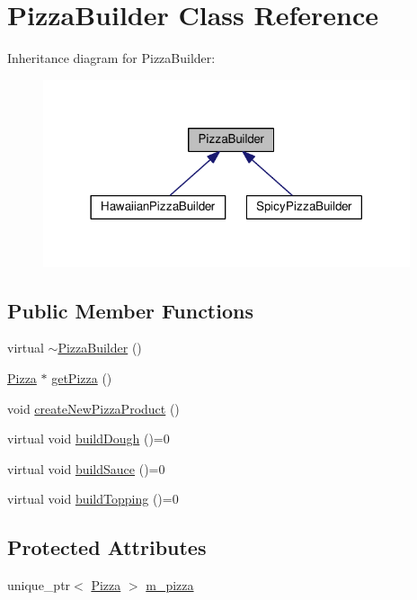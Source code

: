 \hypertarget{classPizzaBuilder}{}\section{Pizza\+Builder Class Reference}
\label{classPizzaBuilder}


Inheritance diagram for Pizza\+Builder\+:\nopagebreak
\begin{figure}[H]
\begin{center}
\leavevmode
\includegraphics[width=306pt]{classPizzaBuilder__inherit__graph}
\end{center}
\end{figure}
\subsection*{Public Member Functions}
\begin{DoxyCompactItemize}
\item 
virtual \hyperlink{classPizzaBuilder_a424dc27395e06a4c38beca703c91c258}{$\sim$\+Pizza\+Builder} ()
\item 
\hyperlink{classPizza}{Pizza} $\ast$ \hyperlink{classPizzaBuilder_a95ce87757351da71ab03f400802a0d1a}{get\+Pizza} ()
\item 
void \hyperlink{classPizzaBuilder_ad321d7aede0131b349c6853768ea1735}{create\+New\+Pizza\+Product} ()
\item 
virtual void \hyperlink{classPizzaBuilder_ab779fb4306ae03b3d82690f5939aaf22}{build\+Dough} ()=0
\item 
virtual void \hyperlink{classPizzaBuilder_a87b3cc72715e7775c8b36e610e8bb389}{build\+Sauce} ()=0
\item 
virtual void \hyperlink{classPizzaBuilder_a46ff797a62789eca327a9ffab95b1b23}{build\+Topping} ()=0
\end{DoxyCompactItemize}
\subsection*{Protected Attributes}
\begin{DoxyCompactItemize}
\item 
unique\+\_\+ptr$<$ \hyperlink{classPizza}{Pizza} $>$ \hyperlink{classPizzaBuilder_a76a40bb3d715332acfaeea121e03d9b1}{m\+\_\+pizza}
\end{DoxyCompactItemize}


